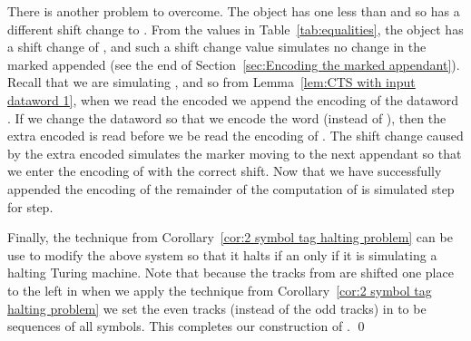 \documentclass[11pt]{article} \usepackage{amsfonts,amsmath,amssymb,amsthm}
\renewenvironment{proof}{{\bfseries\noindent Proof.}}{\qed\vspace{3.5ex}}
\begin{document}
\begin{proof}
There is another problem to overcome. 
The object  has one less  than  and so has a different shift change to .
From the values in Table~\ref{tab:equalities}, the object  has a shift change of , and such a shift change value simulates no change in the marked appended (see the end of Section~\ref{sec:Encoding the marked appendant}). 
Recall that we are simulating , and so from Lemma~\ref{lem:CTS with input dataword 1}, when we read the encoded  we append the encoding of the dataword . 
If we change the dataword so that we encode the word  (instead of ), then the extra encoded  is read before we be read the encoding of . 
The shift change caused by the extra encoded  simulates the marker moving to the next appendant so that we enter the encoding of  with the correct shift. 
Now that we have successfully appended the encoding of  the remainder of the computation of  is simulated step for step. 

Finally, the technique from  Corollary~\ref{cor:2 symbol tag halting problem} can be use to modify the above system so that it halts if an only if it is simulating a halting Turing machine. Note that because the tracks from  are shifted one place to the left in  when we apply the technique from  Corollary~\ref{cor:2 symbol tag halting problem} we set the even tracks (instead of the odd tracks) in  to be sequences of all  symbols. This completes our construction of .
\end{proof}
\end{document}
